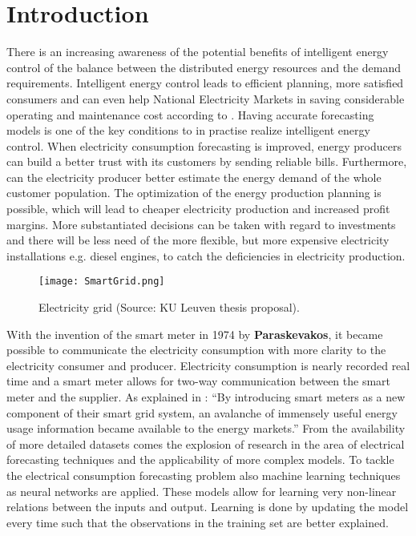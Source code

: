 \chapter{Introduction}
There is an increasing awareness of the potential benefits of intelligent energy control of the balance between the distributed energy resources and the demand requirements. Intelligent energy control leads to efficient planning, more satisfied consumers and can even help National Electricity Markets in saving considerable operating and maintenance cost according to \cite{NarjesFallah2018}. Having accurate forecasting models is one of the key conditions to in practise realize intelligent energy control. When electricity consumption forecasting is improved, energy producers can build a better trust with its customers by sending reliable bills. Furthermore, can the electricity producer better estimate the energy demand of the whole customer population. The optimization of the energy production planning is possible, which will lead to cheaper electricity production and increased profit margins. More substantiated decisions can be taken with regard to investments and there will be less need of the more flexible, but more expensive electricity installations e.g. diesel engines, to catch the deficiencies in electricity production.\\

\begin{figure}[h!]
	\centering
	\texttt{[image: SmartGrid.png]}
	\caption{Electricity grid (Source: KU Leuven thesis proposal).}
	\label{fig:power_image}
\end{figure}

With the invention of the smart meter in 1974 by \textbf{Paraskevakos}, it became possible to communicate the electricity consumption with more clarity to the electricity consumer and producer. Electricity consumption is nearly recorded real time and a smart meter allows for two-way communication between the smart meter and the supplier. As explained in \cite{Depuru2011}: ``By introducing smart meters as a new
component of their smart grid system, an avalanche of immensely useful energy usage information
became available to the energy markets.'' From the availability of more detailed datasets comes the explosion of research in the area of electrical forecasting techniques and the applicability of more complex models. To tackle the electrical consumption forecasting problem also machine learning techniques as neural networks are applied. These models allow for learning very non-linear relations between the inputs and output. Learning is done by updating the model every time such that the observations in the training set are better explained.\\

